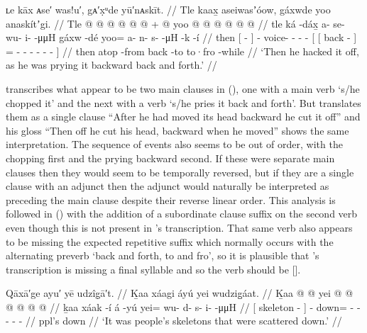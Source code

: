 \ex\label{ex:91-191-then-hacked-off}%
%
\begingl
	\glpreamble	ʟe kāx ᴀse′ was!u′, gᴀ′x̣ᵘde yū′nᴀskīt. //
	\glpreamble	Tle kaax̱ aseiwasʼóow, gáxwde yoo anaskítʼgi. //
	\gla	Tle {}  @ {} {}
		 @ {} @ {} @ {} @ {} @ {} +
		{} {}  @ {} {} 
			yoo @  @ {} @ {} @ {} @ {} @ {} {} //
	\glb	tle {} ká -dáx̱ {}
		a- se- wu- i-  -μμH
		{} {} gáxw -dé {}
			yoo= a- n- s-  -μH -k -í {}  //
	\glc	then {}[  - {}]
		- voice- - -  -
		{}[ {}[ back - {}]
			= - - - 
				- - - {}] //
	\gld	then {} atop -from {}
		 {} {} {} {} {}
		{} {} back -to {}
			to·fro  {} {} {} {} {} -while {}  //
	\glft	‘Then he hacked it off, as he was prying it backward back and forth.’
		//
\endgl
\xe

\citeauthor{swanton:1909} transcribes what appear to be two main clauses in (\lastx), one with a main verb  ‘s/he chopped it’ and the next with a verb  ‘s/he pries it back and forth’.
But \citeauthor{swanton:1909} translates them as a single clause “After he had moved its head backward he cut it off” and his gloss “Then off he cut his head, backward when he moved” shows the same interpretation.
The sequence of events also seems to be out of order, with the chopping first and the prying backward second.
If these were separate main clauses then they would seem to be temporally reversed, but if they are a single clause with an adjunct then the adjunct would naturally be interpreted as preceding the main clause despite their reverse linear order.
This analysis is followed in (\lastx) with the addition of a subordinate clause suffix  on the second verb even though this is not present in \citeauthor{swanton:1909}’s transcription.
That same verb also appears to be missing the expected  repetitive suffix which normally occurs with the alternating preverb  ‘back and forth, to and fro’, so it is plausible that \citeauthor{swanton:1909}’s transcription is missing a final syllable and so the verb should be  [].

\ex\label{ex:91-192-skeletons-scattered}%
%
\begingl
	\glpreamble	Qāxā′ge ayu′ yē udzîg̣ā′t. //
	\glpreamble	Ḵaa xáagi áyú yei wudzig̱áat. //
	\gla	{} Ḵaa  @ {} {}  @ {}
		yei @  @ {} @ {} @ {} @ {} @ {} //
	\glb	{} ḵaa xáak -í {} á -yú
		yei= wu- d- s- i-  -μμH //
	\glc	{}[  skeleton - {}]  -
		down= - - - -  - //
	\gld	{} ppl’s  {} {}  {}
		down  {} {} {} {} {} //
	\glft	‘It was people’s skeletons that were scattered down.’
		//
\endgl
\xe

